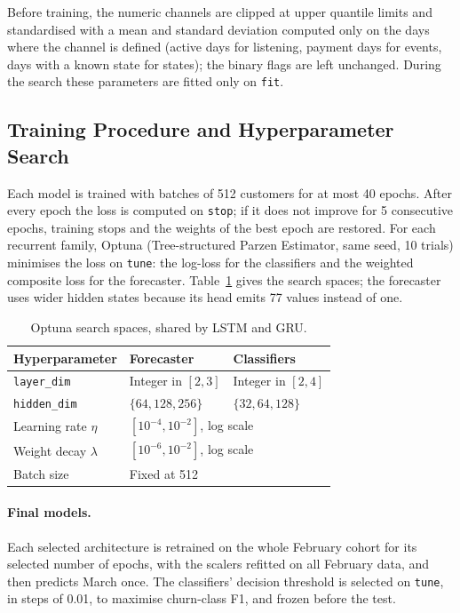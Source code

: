 \documentclass{article}
\begin{document}
Before training, the numeric channels are clipped at upper quantile limits and standardised with a mean and standard deviation computed only on the days where the channel is defined (active days for listening, payment days for events, days with a known state for states); the binary flags are left unchanged. During the search these parameters are fitted only on \texttt{fit}.

\subsection{Training Procedure and Hyperparameter Search}

Each model is trained with batches of 512 customers for at most 40 epochs. After every epoch the loss is computed on \texttt{stop}; if it does not improve for 5 consecutive epochs, training stops and the weights of the best epoch are restored. For each recurrent family, Optuna (Tree-structured Parzen Estimator, same seed, 10 trials) minimises the loss on \texttt{tune}: the log-loss for the classifiers and the weighted composite loss for the forecaster. Table~\ref{tab:w2_space} gives the search spaces; the forecaster uses wider hidden states because its head emits 77 values instead of one.

\begin{table}[H]
\centering
\renewcommand{\arraystretch}{1.3}
\begin{tabular}{|l|l|l|}
\hline
\textbf{Hyperparameter} & \textbf{Forecaster} & \textbf{Classifiers} \\ \hline
\texttt{layer\_dim}    & Integer in $[2, 3]$ & Integer in $[2, 4]$ \\ \hline
\texttt{hidden\_dim}   & $\{64, 128, 256\}$ & $\{32, 64, 128\}$ \\ \hline
Learning rate $\eta$   & \multicolumn{2}{l|}{$[10^{-4}, 10^{-2}]$, log scale} \\ \hline
Weight decay $\lambda$ & \multicolumn{2}{l|}{$[10^{-6}, 10^{-2}]$, log scale} \\ \hline
Batch size             & \multicolumn{2}{l|}{Fixed at 512} \\ \hline
\end{tabular}
\caption{Optuna search spaces, shared by LSTM and GRU.}
\label{tab:w2_space}
\end{table}

\paragraph{Final models.} Each selected architecture is retrained on the whole February cohort for its selected number of epochs, with the scalers refitted on all February data, and then predicts March once. The classifiers' decision threshold is selected on \texttt{tune}, in steps of 0.01, to maximise churn-class F1, and frozen before the test.
\end{document}
